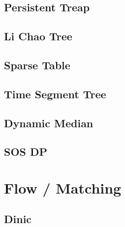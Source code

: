 \documentclass[a4paper,10pt,twocolumn,oneside,x11names]{article}
\begin{document}
\subsection{Persistent Treap}


\subsection{Li Chao Tree}


\subsection{Sparse Table}


\subsection{Time Segment Tree}


\subsection{Dynamic Median}


\subsection{SOS DP}






%

\section{Flow / Matching}

\subsection{Dinic}

\end{document}
